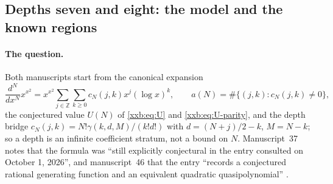 \documentclass[11pt,a4paper]{article}
\numberwithin{equation}{section}
\theoremstyle{definition}
\theoremstyle{remark}
\theoremstyle{plain}
\newcommand{\Z}{\mathbb Z}
\begin{document}
\subsection{Depths seven and eight: the model and the known regions}\label{xxb:d78:sec:model}

\paragraph{The question.}  Both manuscripts start from the canonical expansion
\[
 \frac{d^N}{dx^N}x^{x^2}=x^{x^2}\sum_{j\in\Z}\sum_{k\ge0}c_N(j,k)x^j(\log x)^k,
 \qquad a(N)=\#\{(j,k):c_N(j,k)\ne0\},
\]
the conjectured value $U(N)$ of \eqref{xxb:eq:U} and
\eqref{xxb:eq:U-parity}, and the depth bridge
$c_N(j,k)=N!\gamma(k,d,M)/(k!d!)$ with $d=(N+j)/2-k$, $M=N-k$; so a depth is
an infinite coefficient stratum, not a bound on $N$.  Manuscript~37 notes
that the formula was ``still explicitly conjectural in the entry consulted on
October 1, 2026'', and manuscript~46 that the entry ``records a conjectured
rational generating function and an equivalent quadratic quasipolynomial''
\cite{oeis290268}.
\end{document}
